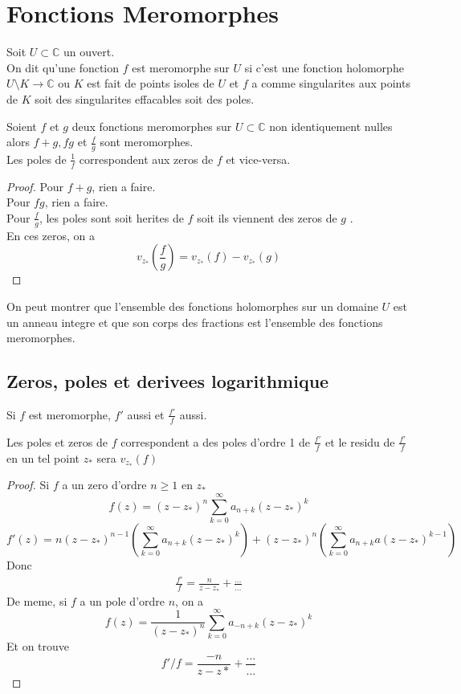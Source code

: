 \documentclass[../main.tex]{subfiles}
\begin{document}
\section{Fonctions Meromorphes}
\begin{defn}
	Soit $U \subset \mathbb{C}$ un ouvert.\\
	On dit qu'une fonction $f$ est meromorphe sur $U$ si c'est une fonction holomorphe $U \setminus K\to \mathbb{C}$ ou $K$ est fait de points isoles de $U$ et $f$ a comme singularites aux points de $K$ soit des singularites effacables soit des poles.
\end{defn}
\begin{lemma}
Soient $f$ et $g$ deux fonctions meromorphes sur $U \subset \mathbb{C}$ non identiquement nulles alors $f+g, fg$ et $\frac{f}{g}$ sont meromorphes.\\
Les poles de $\frac{1}{f}$ correspondent aux zeros de $f$ et vice-versa.
\end{lemma}
\begin{proof}
Pour $f+g$, rien a faire.\\
Pour $fg$, rien a faire.\\
Pour $\frac{f}{g}$, les poles sont soit herites de $f$ soit ils viennent des zeros de $g$ .\\
En ces zeros, on a 
\[ 
v_{z_*} ( \frac{f}{g}) = v_{z_*} ( f) - v_{z_* } ( g) 
\]

\end{proof}
\begin{rmq}
On peut montrer que l'ensemble des fonctions holomorphes sur un domaine $U$ est un anneau integre et que son corps des fractions est l'ensemble des fonctions meromorphes.
\end{rmq}
\subsection{Zeros, poles et derivees logarithmique}
Si $f$ est meromorphe, $f'$ aussi et $\frac{f'}{f}$ aussi.\\
\begin{lemma}
Les poles et zeros de $f$ correspondent a des poles d'ordre 1 de $\frac{f'}{f}$ et le residu de $\frac{f'}{f}$ en un tel point $z_*$ sera $v_{z_*} ( f) $
\end{lemma}
\begin{proof}
Si $f$  a un zero d'ordre $n \geq 1$ en $z_*$ 
\[ 
f( z) = ( z-z_*)^{n} \sum_{k=0}^{ \infty } a_{n+k} ( z-z_*) ^{k}
\]
\[ 
f'(z ) = n ( z-z_*) ^{n-1}\left( \sum_{k=0}^{ \infty } a_{n+k} ( z-z_*) ^{k} \right) +( z-z_*) ^{n}\left( \sum_{k=0}^{ \infty }a_{n+k} a( z-z_*)^{k-1} \right) 
\]
Donc
\begin{align*}
\frac{f'}{f} = \frac{n}{z-z_*}+ \frac{\ldots}{\ldots}
\end{align*}
De meme, si $f$ a un pole d'ordre $n$, on a 
\[ 
f( z) = \frac{1}{( z-z_*) ^{n}} \sum_{k=0}^{ \infty }a_{-n+k} ( z-z_*) ^{k}
\]
Et on trouve
\[ 
f'/f = \frac{-n}{z-z*}+ \frac{\ldots}{\ldots}
\]
	

\end{proof}
\end{document}

